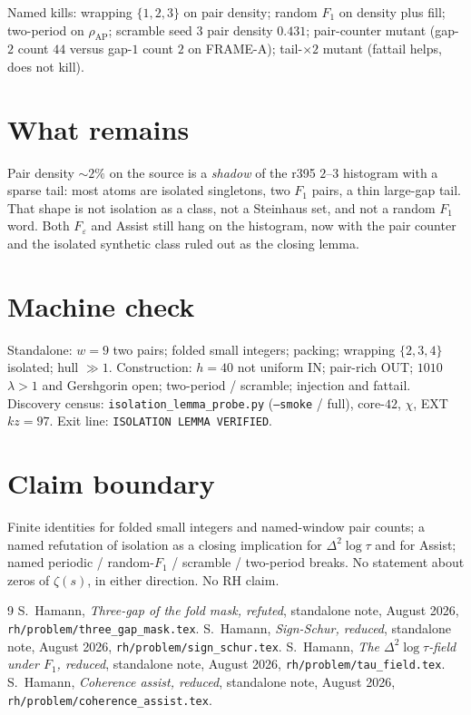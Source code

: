 \documentclass[11pt]{article}
\theoremstyle{remark}
\begin{document}
Named kills: wrapping $\{1,2,3\}$ on pair density; random
$F_1$ on density plus fill; two-period on $\rho_{\mathrm{AP}}$;
scramble seed $3$ pair density $0.431$; pair-counter mutant
(gap-$2$ count $44$ versus gap-$1$ count $2$ on FRAME-A);
tail-$\times 2$ mutant (fattail helps, does not kill).

\section{What remains}\label{sec:rest}

Pair density $\sim 2\%$ on the source is a \emph{shadow} of
the r395 $2$--$3$ histogram with a sparse tail: most atoms are
isolated singletons, two $F_1$ pairs, a thin large-gap tail.
That shape is not isolation as a class, not a Steinhaus set,
and not a random $F_1$ word.
Both $F_\varepsilon$ and Assist still hang on the histogram,
now with the pair counter and the isolated synthetic class
ruled out as the closing lemma.

\section*{Machine check}

Standalone: $w=9$ two pairs; folded small integers; packing;
wrapping $\{2,3,4\}$ isolated; hull $\gg 1$.
Construction: $h=40$ not uniform IN; pair-rich OUT; $1010$
$\lambda>1$ and Gershgorin open; two-period / scramble;
injection and fattail.
Discovery census: \texttt{isolation\_lemma\_probe.py}
(\texttt{--smoke} / full), core-$42$, $\chi$, EXT $kz=97$.
Exit line: \texttt{ISOLATION LEMMA VERIFIED}.

\section*{Claim boundary}

Finite identities for folded small integers and named-window
pair counts; a named refutation of isolation as a closing
implication for $\Delta^2\log\tau$ and for Assist; named
periodic / random-$F_1$ / scramble / two-period breaks.
No statement about zeros of $\zeta(s)$, in either direction.
No RH claim.

\begin{thebibliography}{9}
S.~Hamann,
\textit{Three-gap of the fold mask, refuted},
standalone note, August 2026,
\texttt{rh/problem/three\_gap\_mask.tex}.
S.~Hamann,
\textit{Sign-Schur, reduced},
standalone note, August 2026,
\texttt{rh/problem/sign\_schur.tex}.
S.~Hamann,
\textit{The $\Delta^2\log\tau$-field under $F_1$, reduced},
standalone note, August 2026,
\texttt{rh/problem/tau\_field.tex}.
S.~Hamann,
\textit{Coherence assist, reduced},
standalone note, August 2026,
\texttt{rh/problem/coherence\_assist.tex}.
\end{thebibliography}
\end{document}
